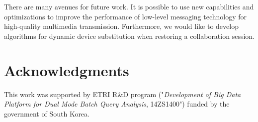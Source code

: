 \documentclass{sig-alternate}
\begin{document}
    There are many avenues for future work. It is possible to use new capabilities and optimizations to improve the performance of low-level messaging technology for high-quality multimedia transmission.
    Furthermore, we would like to develop algorithms for dynamic device substitution when restoring a collaboration session.


\section*{Acknowledgments}
This work was supported by ETRI R\&D program ("\textit{Development of Big Data Platform for Dual Mode Batch Query Analysis}, 14ZS1400")
funded by the government of South Korea.

%

\end{document}
